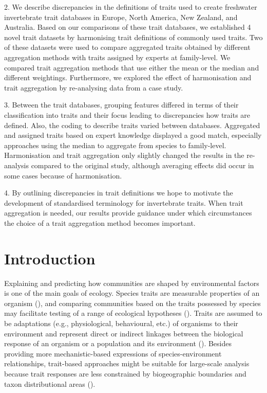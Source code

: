 \documentclass{article}
\begin{document}
2. We describe discrepancies in the definitions of traits used to create freshwater invertebrate trait databases in Europe, North America, New Zealand, and Australia. Based on our comparisons of these trait databases, we established 4 novel trait datasets by harmonising trait definitions of commonly used traits. Two of these datasets were used to compare aggregated traits obtained by different aggregation methods with traits assigned by experts at family-level. We compared trait aggregation methods that use either the mean or the median and different weightings. Furthermore, we explored the effect of harmonisation and trait aggregation by re-analysing data from a case study.

3. Between the trait databases, grouping features differed in terms of their classification into traits and their focus leading to discrepancies how traits are defined. Also, the coding to describe traits varied between databases. Aggregated and assigned traits based on expert knowledge displayed a good match, especially approaches using the median to aggregate from species to family-level. Harmonisation and trait aggregation only slightly changed the results in the re-analysis compared to the original study, although averaging effects did occur in some cases because of harmonisation.

4. By outlining discrepancies in trait definitions we hope to motivate the development of standardised terminology for invertebrate traits. When trait aggregation is needed, our results provide guidance under which circumstances the choice of a trait aggregation method becomes important. 

\newpage

\section*{Introduction}

Explaining and predicting how communities are shaped by environmental factors is one of the main goals of ecology. Species traits are measurable properties of an organism (\cite{mcgill_rebuilding_2006}), and comparing communities based on the traits possessed by species may facilitate testing of a range of ecological hypotheses (\cite{heino_jani_macroecological_2013}). Traits are assumed to be adaptations (e.g., physiological, behavioural, etc.) of organisms to their environment and represent direct or indirect linkages between the biological response of an organism or a population and its environment (\cite{southwood_habitat_1977, verberk_delivering_2013}).
Besides providing more mechanistic-based expressions of species-environment relationships, trait-based approaches might be suitable for large-scale analysis because trait responses are less constrained by biogeographic boundaries and taxon distributional areas (\cite{baird_toward_2011, bonada_taxonomic_2007}). 
\end{document}
